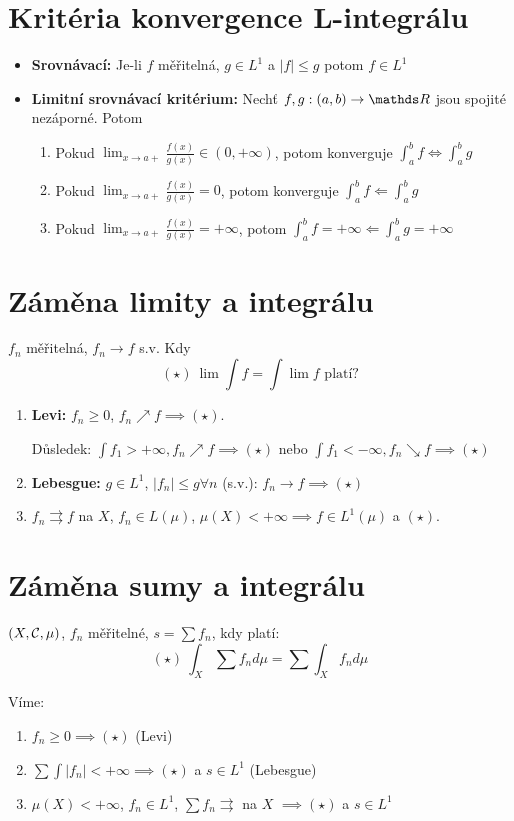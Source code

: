 \documentclass[12pt,a4paper]{article}
\begin{document}
\section{Kritéria konvergence L-integrálu}
\begin{itemize}
	\item {\bf Srovnávací:} Je-li $f$ měřitelná, $g \in L^1$ a $|f| \leq g$ potom $f \in L^1$
	\item {\bf Limitní srovnávací kritérium:} Nechť $f,g : (a,b) \to \R$ jsou spojité nezáporné. Potom
		\begin{enumerate}
			\item Pokud $\lim_{x \to a+} \frac{f(x)}{g(x)} \in (0, +\infty)$, potom konverguje $\int_a^b f \iff \int_a^b g$
			\item Pokud $\lim_{x \to a+} \frac{f(x)}{g(x)} = 0$, potom konverguje $\int_a^b f \Leftarrow \int_a^b g$
			\item Pokud $\lim_{x \to a+} \frac{f(x)}{g(x)} = +\infty$, potom $\int_a^b f = +\infty \Leftarrow \int_a^b g = +\infty$
		\end{enumerate}
\end{itemize}

\section{Záměna limity a integrálu}
	$f_n$ měřitelná, $f_n \to f$ s.v. Kdy $$(\star)~\lim \int f = \int \lim f \text{ platí?}$$
\begin{enumerate}
	\item {\bf Levi:} $f_n \geq 0$, $f_n \nearrow f \implies (\star)$.

		  Důsledek: $\int f_1 > +\infty, f_n \nearrow f \implies (\star)$ nebo $\int f_1 < -\infty, f_n \searrow f \implies (\star)$
	\item {\bf Lebesgue:} $g \in L^1$, $|f_n| \leq g \forall n$ (s.v.): $f_n \to f \implies (\star)$
	\item $f_n \rightrightarrows f$ na $X$, $f_n \in L(\mu)$, $\mu(X) < +\infty \implies f \in L^1(\mu)$ a $(\star)$.
\end{enumerate}

\section{Záměna sumy a integrálu}
$(X, \mathcal{ C }, \mu)$, $f_n$ měřitelné, $s = \sum f_n$, kdy platí:
	$$(\star)~\int_X \sum f_n d\mu = \sum \int_X f_n d\mu$$

Víme:
\begin{enumerate}
	\item $f_n \geq 0 \implies (\star)$ (Levi)
	\item $\sum \int |f_n| < +\infty \implies (\star)$ a $s \in L^1$ (Lebesgue)
	\item $\mu(X) < +\infty$, $f_n \in L^1$, $\sum f_n \rightrightarrows$ na $X$ $\implies (\star)$ a $s \in L^1$
\end{enumerate}
\end{document}
